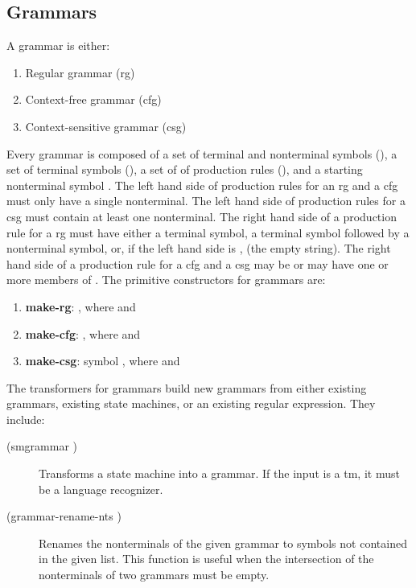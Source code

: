 \documentclass{eptcs}
\begin{document}
\subsection{Grammars}
A grammar is either:
 \begin{enumerate}
   \item Regular grammar (\textsf{rg})
   \item Context-free grammar (\textsf{cfg})
   \item Context-sensitive grammar (\textsf{csg})
 \end{enumerate}
Every grammar is composed of a set of terminal and nonterminal symbols (), a set of terminal symbols (), a set of of production rules (), and a starting nonterminal symbol . The left hand side of production rules for an \textsf{rg} and a \textsf{cfg} must only have a single nonterminal. The left hand side of production rules for a \textsf{csg} must contain at least one nonterminal. The right hand side of a production rule for a \textsf{rg} must have either a terminal symbol, a terminal symbol followed by a nonterminal symbol, or, if the left hand side is ,  (the empty string). The right hand side of a production rule for a \textsf{cfg} and a \textsf{csg} may be  or may have one or more members of . The primitive constructors for grammars are:
\begin{enumerate}
  \item \textbf{make-rg}:     , \newline  where  and 

  \item \textbf{make-cfg}:     , \newline  where  and 

  \item \textbf{make-csg}:    symbol  , \newline  where  and 
\end{enumerate}

The transformers for grammars build new grammars from either existing grammars, existing state machines, or an existing regular expression. They include:
\begin{description}
  \item[(smgrammar )] Transforms a state machine into a grammar. If the input is a \textsf{tm}, it must be a language recognizer.

  \item[(grammar-rename-nts  )] Renames the nonterminals of the given grammar to symbols not contained in the given list. This function is useful when the intersection of the nonterminals of two grammars must be empty.
\end{description}
\end{document}
